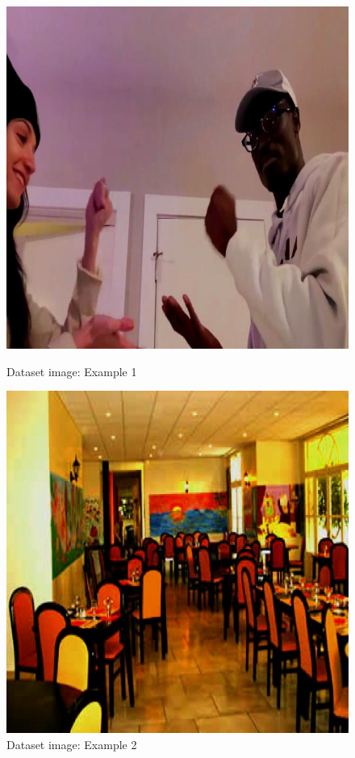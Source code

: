 \documentclass[../main]{subfiles}
\begin{document}
\begin{figure}[H]
    \centering
    \begin{minipage}{0.48\textwidth}
        \centering
        \includegraphics[width=\linewidth]{./figures/0058_png.rf.8ce89ad8eaffb9cda78bfbdbafa0bc4e}
        \caption{Dataset image: Example 1}
        \label{fig:example1}
    \end{minipage}\hfill
    \begin{minipage}{0.48\textwidth}
        \centering
        \includegraphics[width=\linewidth]{./figures/40_salle_restaurant_jpg.rf.78cf734a80c15db11168024464278a57}
        \caption{Dataset image: Example 2}
        \label{fig:example2}
    \end{minipage}
\end{figure}
\end{document}
